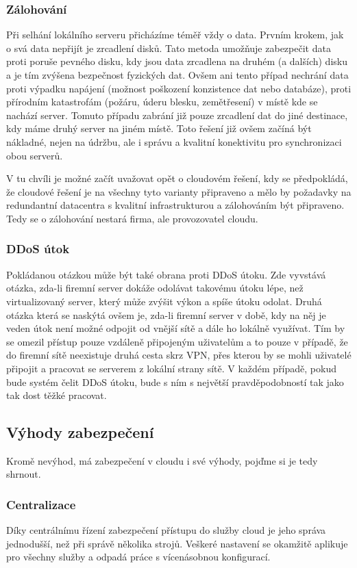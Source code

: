 \subsubsection{Zálohování}
Při selhání lokálního serveru přicházíme téměř vždy o data. Prvním krokem, jak o svá data nepřijít je zrcadlení disků. Tato metoda umožňuje zabezpečit data proti poruše pevného disku, kdy jsou data zrcadlena na druhém (a dalších) disku a je tím zvýšena bezpečnost fyzických dat. Ovšem ani tento případ nechrání data proti výpadku napájení (možnost poškození konzistence dat nebo databáze), proti přírodním katastrofám (požáru, úderu blesku, zemětřesení) v místě kde se nachází server. Tomuto případu zabrání již pouze zrcadlení dat do jiné destinace, kdy máme druhý server na jiném místě. Toto řešení již ovšem začíná být nákladné, nejen na údržbu, ale i správu a kvalitní konektivitu pro synchronizaci obou serverů.

V tu chvíli je možné začít uvažovat opět o cloudovém řešení, kdy se předpokládá, že cloudové řešení je na všechny tyto varianty připraveno a mělo by požadavky na redundantní datacentra s kvalitní infrastrukturou a zálohováním být připraveno. Tedy se o zálohování nestará firma, ale provozovatel cloudu.\cite{podnikatel:zalohovani}

\subsubsection{DDoS útok}
Pokládanou otázkou může být také obrana proti DDoS útoku. Zde vyvstává otázka, zda-li firemní server dokáže odolávat takovému útoku lépe, než virtualizovaný server, který může zvýšit výkon a spíše útoku odolat. Druhá otázka která se naskýtá ovšem je, zda-li firemní server v době, kdy na něj je veden útok není možné odpojit od vnější sítě a dále ho lokálně využívat. Tím by se omezil přístup pouze vzdáleně připojeným uživatelům a to pouze v případě, že do firemní sítě neexistuje druhá cesta skrz VPN, přes kterou by se mohli uživatelé připojit a pracovat se serverem z lokální strany sítě.
V každém případě, pokud bude systém čelit DDoS útoku, bude s ním s největší pravděpodobností tak jako tak dost těžké pracovat.

\subsection{Výhody zabezpečení}
Kromě nevýhod, má zabezpečení v cloudu i své výhody, pojďme si je tedy shrnout.

\subsubsection{Centralizace}
Díky centrálnímu řízení zabezpečení přístupu do služby cloud je jeho správa jednodušší, než při správě několika strojů. Veškeré nastavení se okamžitě aplikuje pro všechny služby a odpadá práce s vícenásobnou konfigurací.

